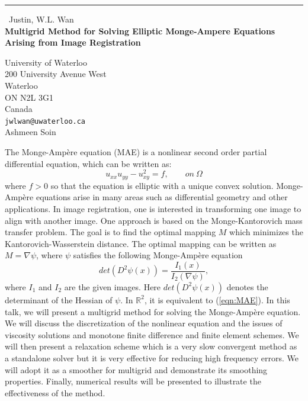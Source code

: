 \documentclass{report}
\begin{document}
\begin{center}
\rule{6in}{1pt} \
{\large Justin, W.L. Wan \\
{\bf Multigrid Method for Solving Elliptic Monge-Ampere Equations Arising from Image Registration}}

University of Waterloo \\ 200 University Avenue West \\ Waterloo \\ ON N2L 3G1 \\ Canada
\\
{\tt jwlwan@uwaterloo.ca}\\
Ashmeen Soin\end{center}

The Monge-Amp\`{e}re equation (MAE) is a nonlinear second order partial
differential equation, which can be written as:
\begin{equation}
u_{xx} u_{yy} - u^2_{xy} = f, \qquad on \ \Omega
\label{eqn:MAE}
\end{equation}
where $f>0$ so that the equation is elliptic with a unique convex solution.
Monge-Amp\`{e}re equations arise in many areas such as differential geometry
and other applications. In image registration, one is interested in
transforming one image to align with another image. One approach is based on
the Monge-Kantorovich mass transfer problem. The goal is to find the optimal
mapping $M$ which minimizes the Kantorovich-Wasserstein distance. The
optimal mapping can be written as $M=\nabla \psi$, where $\psi$ satisfies
the following Monge-Amp\`{e}re equation
$$
det(D^2 \psi(x)) = \frac{I_1(x)}{I_2(\nabla \psi)},
$$
where $I_1$ and $I_2$ are the given images.
Here $det(D^2 \psi(x))$ denotes the determinant of the Hessian of $\psi$.
In $\mathbb{R}^2$, it is equivalent to (\ref{eqn:MAE}).
In this talk, we will present a multigrid method for solving the
Monge-Amp\`{e}re equation. We will discuss the discretization of the
nonlinear equation and the issues of viscosity solutions and monotone
finite difference and finite element schemes. We will then present a
relaxation scheme which is a very slow convergent method as a standalone
solver but it is very effective for reducing high frequency errors. We will
adopt it as a smoother for multigrid and demonstrate its smoothing
properties. Finally, numerical results will be presented to illustrate
the effectiveness of the method.
\end{document}
